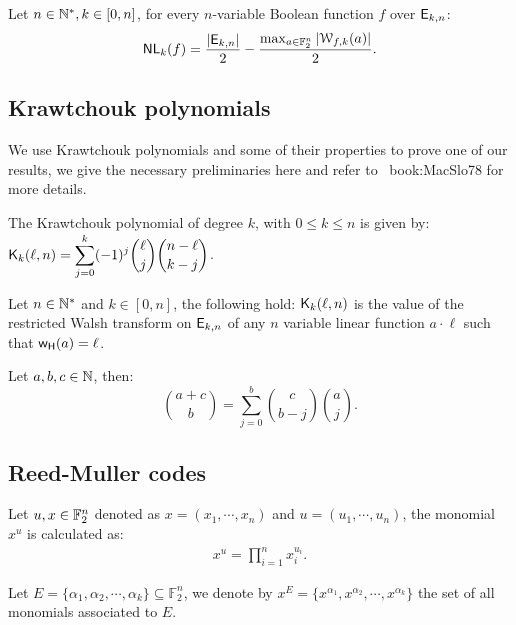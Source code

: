 \documentclass[11pt]{llncs}
\begin{document}
\begin{Prop}\label{prop:nlk}
	Let $n\in \mathbb{N}^*, k\in [0,n]$, for every $n$-variable Boolean function $f$ over $\mathsf{E}_{k,n}$:
	\[ \mathsf{NL}_{k}(f)=\frac{|\mathsf{E}_{k,n}|}{2} -\frac{\max_{a\in \mathbb{F}_2^n} |\mathcal{W}_{f,k}(a)|}{2}  .\]
\end{Prop}


\subsection{Krawtchouk polynomials}
We use Krawtchouk polynomials and some of their properties to prove one of our results, we give the necessary preliminaries here and refer to \eg ~{book:MacSlo78} for more details.

\begin{definition}\label{def:Kraw}
	The Krawtchouk polynomial of degree $k$, with $0\leq k\leq n$ is given by: $ \displaystyle \mathsf{K}_{k}(\ell,n)=\sum_{j=0}^{k} (-1)^j \binom{\ell}{j} \binom{n-\ell}{k-j}$.
\end{definition}


\begin{Prop}\label{prop:Kr}
	Let $n\in \mathbb{N}^*$ and $k\in [0,n]$, the following hold:
 $\mathsf{K}_{k}(\ell,n)$ is the value of the restricted Walsh transform on $\mathsf{E}_{k,n}$ of any $n$ variable linear function $a\cdot \ell$ such that $\mathsf{w_H}(a)=\ell$.
\end{Prop}


\begin{Prop}\label{prop:Vandermonde}
	Let $a,b,c \in \mathbb{N}$, then:
	\begin{equation*}
	\binom{a+c}{b}=\sum_{j=0}^b\binom{c}{b-j}  \binom{a}{j}.
	\end{equation*}
\end{Prop}



\fi

\subsection{Reed-Muller codes}

\begin{definition}
    Let $u, x\in \mathbb{F}_2^n$ denoted as $x=(x_1,\cdots,x_n)$ and $u=(u_1,\cdots,u_n)$, the monomial $x^{u}$ is calculated as:
    \begin{align*}
        x^{u} = \prod_{i=1}^n x_i^{u_i}.
    \end{align*}
    
    Let $E = \{\alpha_1, \alpha_2, \cdots, \alpha_k\} \subseteq \mathbb{F}_2^n$, we denote by $x^E = \{x^{\alpha_1}, x^{\alpha_2}, \cdots, x^{\alpha_k}\}$ the set of all monomials associated to $E$.
\end{definition}
\end{document}
